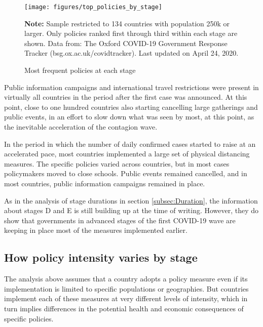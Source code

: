 \documentclass[12pt,english]{article}
\begin{document}
\begin{figure}[H]
	\singlespacing
	\centering
	 \caption{Most frequent policies at each stage}  \label{fig:policies_by_stage}
	\resizebox{0.7\width}{!} {
		\begin{threeparttable}

 			  \texttt{[image: figures/top\_policies\_by\_stage]}
  			 \begin{tablenotes}[flushleft]\vspace*{-7bp}
			\item \textbf{Note:} Sample restricted to 134 countries with population 250k or larger. Only policies ranked first through third within each stage are shown. Data from: The Oxford COVID-19 Government Response Tracker (bsg.ox.ac.uk/covidtracker). Last updated on April 24, 2020.
			 \end{tablenotes}
  		\end{threeparttable}
 		}
  	 \onehalfspacing
\end{figure}

Public information campaigns and international travel restrictions were present in virtually all countries in the period after the first case was announced.  At this point, close to one hundred countries also starting cancelling large gatherings and public events, in an effort to slow down what was seen by most, at this point, as the inevitable acceleration of the contagion wave.

In the period in which the number of daily confirmed cases started to raise at an accelerated pace, most countries implemented a large set of physical distancing measures. The specific policies varied across countries, but in most cases policymakers moved to close schools. Public events remained cancelled, and in most countries, public information campaigns remained in place.

As in the analysis of stage durations in section \ref{subsec:Duration}, the information about stages D and E is still building up at the time of writing. However, they do show that governments in advanced stages of the first COVID-19 wave are keeping in place most of the measures implemented earlier.

\subsection{How policy intensity varies by stage \label{subsec:Policies-stringency}}

The analysis above assumes that a country adopts a policy  measure even if its implementation is limited to specific populations or geographies.  But countries implement each of these measures at very different levels of intensity, which in turn implies differences in the potential health and economic consequences of specific policies.
\end{document}
